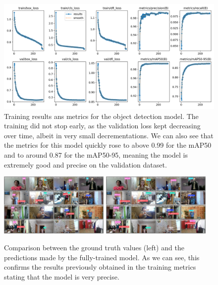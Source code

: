 \documentclass[12pt]{article}
\begin{document}
\begin{figure}[H]
  \centering
  \includegraphics[width=\textwidth]{./pictures/smallhands_results.png}
  \caption{Training results ans metrics for the object detection model. The training did not stop early, as the validation loss kept decreasing over time, albeit in very small decrementations. We can also see that the metrics for this model quickly rose to above 0.99 for the mAP50 and to around 0.87 for the mAP50-95, meaning the model is extremely good and precise on the validation dataset.}
\end{figure}

\begin{figure}[H]
  \centering
  \includegraphics[width=0.475\textwidth]{./pictures/smallhands_batch_labels.jpg}
  \hspace{\fill}
  \includegraphics[width=0.475\textwidth]{./pictures/smallhands_batch_pred.jpg}
  \caption{Comparison between the ground truth values (left) and the predictions made by the fully-trained model. As we can see, this confirms the results previously obtained in the training metrics stating that the model is very precise.}\label{fig:xyz}
\end{figure}
\end{document}
